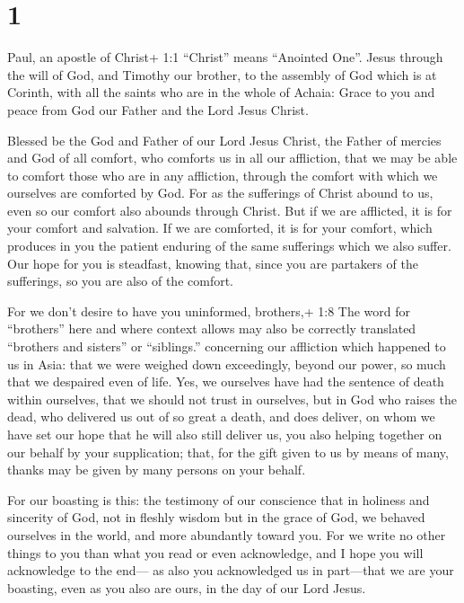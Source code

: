 \hypertarget{section}{%
\section{1}\label{section}}

 Paul, an apostle of Christ+ 1:1 ``Christ'' means ``Anointed
One''. Jesus through the will of God, and Timothy our brother, to the
assembly of God which is at Corinth, with all the saints who are in the
whole of Achaia:  Grace to you and peace from God our Father
and the Lord Jesus Christ.

 Blessed be the God and Father of our Lord Jesus Christ, the
Father of mercies and God of all comfort,  who comforts us
in all our affliction, that we may be able to comfort those who are in
any affliction, through the comfort with which we ourselves are
comforted by God.  For as the sufferings of Christ abound to
us, even so our comfort also abounds through Christ.  But if
we are afflicted, it is for your comfort and salvation. If we are
comforted, it is for your comfort, which produces in you the patient
enduring of the same sufferings which we also suffer.  Our
hope for you is steadfast, knowing that, since you are partakers of the
sufferings, so you are also of the comfort.

 For we don't desire to have you uninformed, brothers,+ 1:8
The word for ``brothers'' here and where context allows may also be
correctly translated ``brothers and sisters'' or ``siblings.''
concerning our affliction which happened to us in Asia: that we were
weighed down exceedingly, beyond our power, so much that we despaired
even of life.  Yes, we ourselves have had the sentence of
death within ourselves, that we should not trust in ourselves, but in
God who raises the dead,  who delivered us out of so great
a death, and does deliver, on whom we have set our hope that he will
also still deliver us,  you also helping together on our
behalf by your supplication; that, for the gift given to us by means of
many, thanks may be given by many persons on your behalf.

 For our boasting is this: the testimony of our conscience
that in holiness and sincerity of God, not in fleshly wisdom but in the
grace of God, we behaved ourselves in the world, and more abundantly
toward you.  For we write no other things to you than what
you read or even acknowledge, and I hope you will acknowledge to the
end---  as also you acknowledged us in part---that we are
your boasting, even as you also are ours, in the day of our Lord Jesus.

